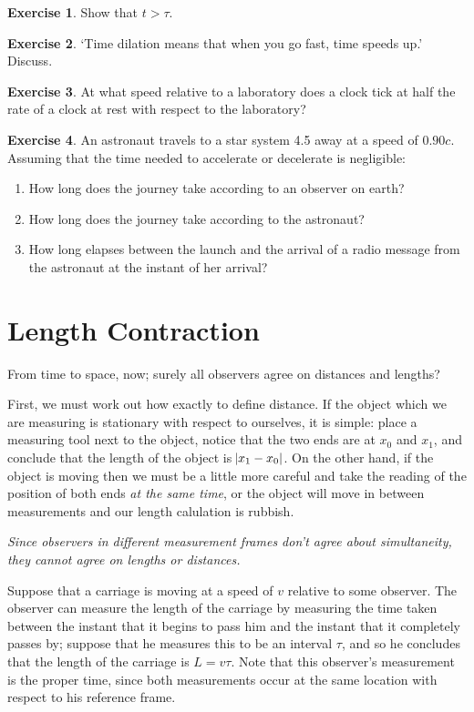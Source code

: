 \documentclass[a4paper]{amsbook}
\theoremstyle{definition}
\newtheorem{exercise}{Exercise}
\numberwithin{exercise}{chapter}
\numberwithin{exercise}{chapter}
\begin{document}
\begin{exercise}
  Show that $ t > \tau $.
\end{exercise}

\begin{exercise}
  `Time dilation means that when you go fast, time speeds up.' Discuss.
\end{exercise}

\begin{exercise}
  At what speed relative to a laboratory does a clock tick at half the rate of a clock at rest with respect to the laboratory?
\end{exercise}

\begin{exercise}
  An astronaut travels to a star system \SI{4.5}{\lightyear} away at a speed of $ 0.90c $. Assuming that the time needed to accelerate or
  decelerate is negligible:
  \begin{enumerate}
    \item How long does the journey take according to an observer on earth?
    \item How long does the journey take according to the astronaut?
    \item How long elapses between the launch and the arrival of a radio message from the astronaut at the instant of her arrival?
  \end{enumerate}
\end{exercise}

\section{Length Contraction}
From time to space, now; surely all observers agree on distances and lengths?

First, we must work out how exactly to define distance. If the object which we are measuring is stationary with respect
to ourselves, it is simple: place a measuring tool next to the object, notice that the two ends are at $ x_0 $ and $ x_1 $,
and conclude that the length of the object is $ \abs{x_1 - x_0} $. On the other hand, if the object is moving then we must be
a little more careful and take the reading of the position of both ends \emph{at the same time}, or the object will move in
between measurements and our length calulation is rubbish.

\emph{Since observers in different measurement frames don't agree about simultaneity, they cannot agree on lengths or distances.}

Suppose that a carriage is moving at a speed of $ v $ relative to some observer. The observer can measure the length of the carriage by
measuring the time taken between the instant that it begins to pass him and the instant that it completely passes by; suppose that he
measures this to be an interval $ \tau $, and so he concludes that the length of the carriage is $ L = v\tau $. Note that this observer's
measurement is the proper time, since both measurements occur at the same location with respect to his reference frame.
\end{document}
